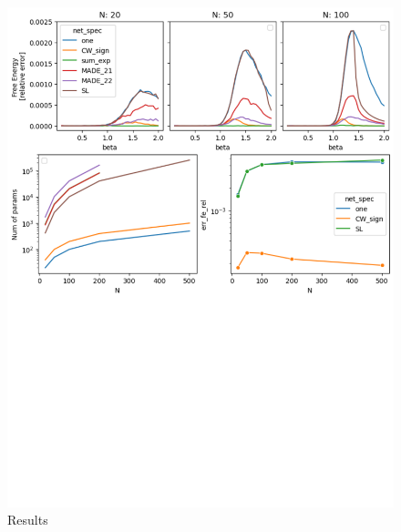 \documentclass{article}
\begin{document}
\begin{figure}[!h]
    \centering
    \includegraphics[width=1\textwidth]{img/CW_res.pdf}
    \caption{Results}
    \label{fig:curie_weiss}
\end{figure}
\end{document}
